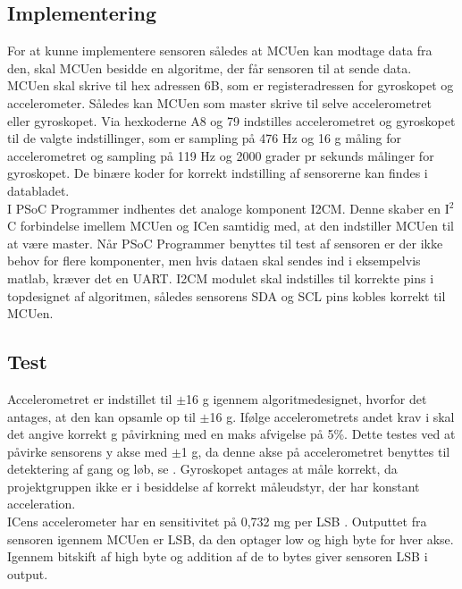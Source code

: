 \subsection{Implementering}
For at kunne implementere sensoren således at MCUen kan modtage data fra den, skal MCUen besidde en algoritme, der får sensoren til at sende data. MCUen skal skrive til hex adressen 6B, som er registeradressen for gyroskopet og accelerometer. Således kan MCUen som master skrive til selve accelerometret eller gyroskopet. Via hexkoderne A8 og 79 indstilles accelerometret og gyroskopet til de valgte indstillinger, som er sampling på 476 Hz og 16 g måling for accelerometret og sampling på 119 Hz og 2000 grader pr sekunds målinger for gyroskopet. De binære koder for korrekt indstilling af sensorerne kan findes i databladet. \citep{STMicroelectronics2016}\\
I PSoC Programmer indhentes det analoge komponent I2CM. Denne skaber en I$^2$C forbindelse imellem MCUen og ICen samtidig med, at den indstiller MCUen til at være master. Når PSoC Programmer benyttes til test af sensoren er der ikke behov for flere komponenter, men hvis dataen skal sendes ind i eksempelvis matlab, kræver det en UART. I2CM modulet skal indstilles til korrekte pins i topdesignet af algoritmen, således sensorens SDA og SCL pins kobles korrekt til MCUen.
\subsection{Test}
Accelerometret er indstillet til $\pm$16 g igennem algoritmedesignet, hvorfor det antages, at den kan opsamle op til $\pm$16 g. Ifølge accelerometrets andet krav i  skal det angive korrekt g påvirkning med en maks afvigelse på 5\%. Dette testes ved at påvirke sensorens y akse med $\pm$1 g, da denne akse på accelerometret benyttes til detektering af gang og løb, se . Gyroskopet antages at måle korrekt, da projektgruppen ikke er i besiddelse af korrekt måleudstyr, der har konstant acceleration.\\
ICens accelerometer har en sensitivitet på 0,732 mg per LSB \citep{STMicroelectronics2016}. Outputtet fra sensoren igennem MCUen er LSB, da den optager low og high byte for hver akse. Igennem bitskift af high byte og addition af de to bytes giver sensoren LSB i output. 

